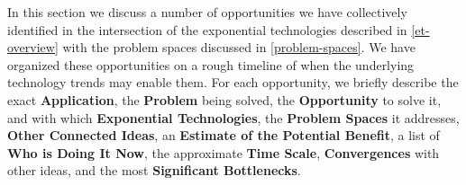 \documentclass[letter,11pt]{article}
\begin{document}

In this section we discuss a number of opportunities we have collectively
identified in the intersection of the exponential technologies described in
\autoref{et-overview} with the problem spaces discussed in
\autoref{problem-spaces}. We have organized these opportunities on a rough
timeline of when the underlying technology trends may enable them. For each
opportunity, we briefly describe the exact {\bf Application}, the {\bf Problem}
being solved, the {\bf Opportunity} to solve it, and with which {\bf
Exponential Technologies}, the {\bf Problem Spaces} it addresses, {\bf Other
Connected Ideas}, an {\bf Estimate of the Potential Benefit}, a list of {\bf
Who is Doing It Now}, the approximate {\bf Time Scale}, {\bf Convergences} with
other ideas, and the most {\bf Significant Bottlenecks}.

\end{document}
